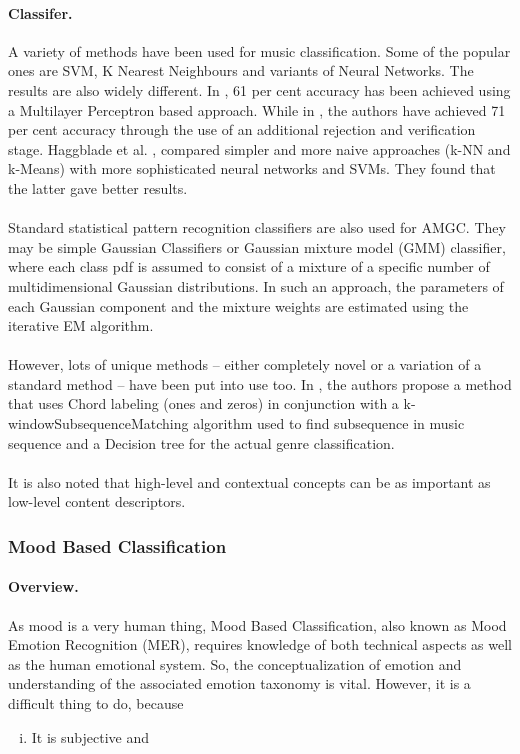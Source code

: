 {\paragraph{Classifer.}

A variety of methods have been used for music classification. Some of the popular ones are SVM, K Nearest Neighbours and variants of Neural Networks.
The results are also widely different. In \cite{Neumayer2004}, 61 per cent accuracy has been achieved using a Multilayer Perceptron based approach. 
While in \cite{Koerich2013}, the authors have achieved 71 per cent accuracy through the use of an additional rejection and verification stage.
Haggblade et al. \cite{Haggblade2011}, compared simpler and more naive approaches (k-NN and k-Means) with more sophisticated neural networks and SVMs. 
They found that the latter gave better results.\\
\\
Standard statistical pattern recognition classifiers are also used for AMGC.
They may be simple Gaussian Classifiers or Gaussian mixture model (GMM) classifier, where each class pdf is assumed to consist of a mixture of a specific number of multidimensional Gaussian distributions.
In such an approach, the parameters of each Gaussian component and the mixture weights are estimated using the iterative EM algorithm.\\
\\
However, lots of unique methods -- either completely novel or a variation of a standard method -- have been put into use too. In \cite{Nasridinov2014}, the authors
propose a method that uses Chord labeling (ones and zeros) in conjunction with a k-windowSubsequenceMatching algorithm used to find subsequence in music sequence
and a Decision tree for the actual genre classification.\\
\\
It is also noted that high-level and contextual concepts can be as important as low-level content descriptors. \cite{Anglade2010} 

\subsubsection{Mood Based Classification}

\paragraph{Overview.}

As mood is a very human thing, Mood Based Classification, also known as Mood Emotion Recognition (MER), requires knowledge of both technical aspects as well as the human emotional system.
So, the conceptualization of emotion and understanding of the associated emotion taxonomy is vital. However, it is a difficult thing to do, because 
\begin{enumerate}[(i)]
        \item It is subjective and 


\end{enumerate}}
